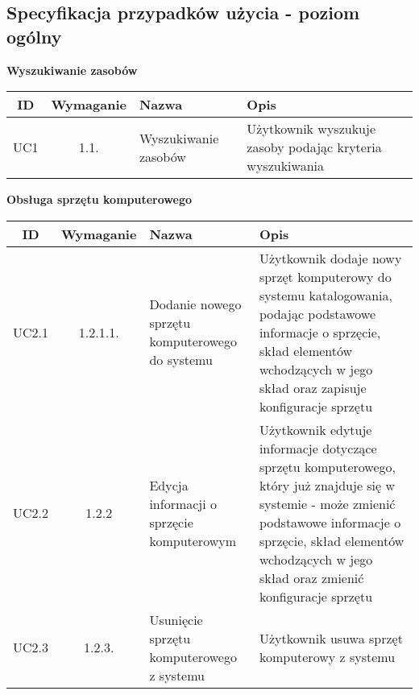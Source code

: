 \subsection{Specyfikacja przypadków użycia - poziom ogólny}

\begin{table}[!ht]
	\begin{center}
		{\Large\bf Wyszukiwanie zasobów} \\
	\end{center}
\begin{tabular}{| c | c | p{} | p{} |}
	\hline \textbf{ID} & \textbf{Wymaganie} & \textbf{Nazwa} & \textbf{Opis} \\
	\hline UC1 & 1.1. & Wyszukiwanie zasobów  & Użytkownik wyszukuje zasoby podając kryteria wyszukiwania \\
	\hline
\end{tabular}
\end{table}

\begin{table}[!ht]
	\begin{center}
		{\Large\bf Obsługa sprzętu komputerowego} \\
	\end{center}
\begin{tabular}{| c | c | p{} | p{} |}
	\hline \textbf{ID} & \textbf{Wymaganie} & \textbf{Nazwa} & \textbf{Opis} \\
	\hline UC2.1 & 1.2.1.1. & Dodanie nowego sprzętu komputerowego do systemu & Użytkownik dodaje nowy sprzęt komputerowy do systemu katalogowania, podając podstawowe informacje o sprzęcie, skład elementów wchodzących w jego skład oraz zapisuje konfiguracje sprzętu \\
	\hline UC2.2 & 1.2.2 & Edycja informacji o sprzęcie komputerowym & Użytkownik edytuje informacje dotyczące sprzętu komputerowego, który już znajduje się w systemie - może zmienić podstawowe informacje o sprzęcie, skład elementów wchodzących w jego skład oraz zmienić konfiguracje sprzętu \\
	\hline UC2.3 & 1.2.3. & Usunięcie sprzętu komputerowego z systemu & Użytkownik usuwa sprzęt komputerowy z systemu \\
	\hline
\end{tabular}
\end{table}


